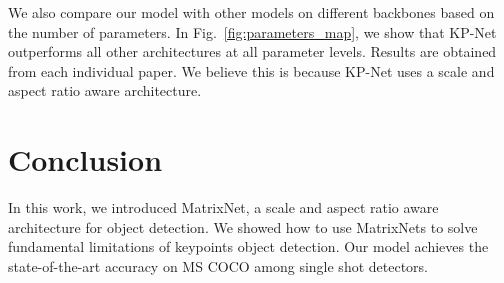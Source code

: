 \documentclass[10pt,twocolumn,letterpaper]{article}
\begin{document}
We also compare our model with other models on different backbones based on the number of parameters. In Fig.~\ref{fig:parameters_map}, we show that KP-Net outperforms all other architectures at all parameter levels. Results are obtained from each individual paper. We believe this is because KP-Net uses a scale and aspect ratio aware architecture.  
\vspace{-0.25cm}
\section{Conclusion}
\vspace{-0.15cm}
In this work, we introduced MatrixNet, a scale and aspect ratio aware architecture for object detection. We showed how to use MatrixNets to solve fundamental limitations of keypoints object detection. Our model achieves the state-of-the-art accuracy on MS COCO among single shot detectors.
\vspace{-0.25cm}
{\small


}
\end{document}
